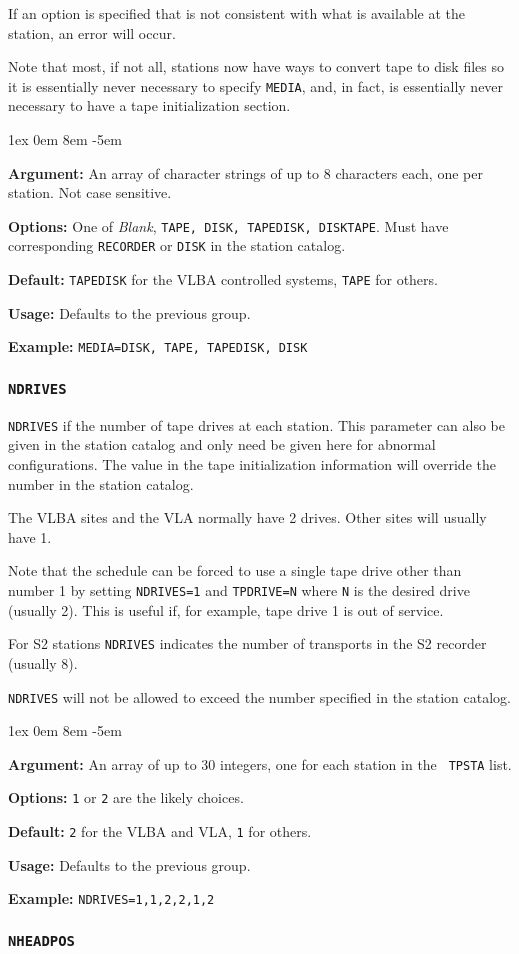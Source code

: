 \documentclass{report}
\newcommand{\rcwbox}[5]{
  \begin{list}{}{\parsep 1ex  \itemsep 0em
                 \leftmargin 8em  \itemindent -5em }
    \item {\bf Argument:} #1
    \item {\bf Options:}  #2
    \item {\bf Default:}  #3
    \item {\bf Usage:}    #4
    \item {\bf Example:}  #5
  \end{list}
}
\begin{document}
If an option is specified that is not consistent with what is available
at the station, an error will occur.

Note that most, if not all, stations now have ways to convert tape to
disk files so it is essentially never necessary to specify {\tt MEDIA},
and, in fact, is essentially never necessary to have a tape initialization
section.


\rcwbox
{An array of character strings of up to 8 characters each, one per
station.  Not case sensitive.}
{One of {\sl Blank}, {\tt TAPE, DISK, TAPEDISK, DISKTAPE}.  Must
have corresponding {\tt RECORDER} or {\tt DISK} in the station
catalog.}
{{\tt TAPEDISK} for the VLBA controlled systems, {\tt TAPE} for others.}
{Defaults to the previous group.}
{{\tt MEDIA=DISK, TAPE, TAPEDISK, DISK}}


\subsubsection{\label{TP:NDRIVES}{\tt NDRIVES}}

{\tt NDRIVES} if the number of tape drives at each station. This
parameter can also be given in the station catalog and only need
be given here for abnormal configurations.  The value in the
tape initialization information will override the number in the
station catalog.

The VLBA sites and the VLA normally have 2 drives.
Other sites will usually have 1.

Note that the schedule can be forced to use a single tape drive other
than number 1 by setting {\tt NDRIVES=1} and {\tt TPDRIVE=N} where
{\tt N} is the desired drive (usually 2). This is useful if, for
example, tape drive 1 is out of service.

For S2 stations {\tt NDRIVES} indicates the number of transports in the
S2 recorder (usually 8).

{\tt NDRIVES} will not be allowed to exceed the number specified in
the station catalog.

\rcwbox
{An array of up to 30 integers, one for each station in the {\tt
TPSTA} list.}
{{\tt 1} or {\tt 2} are the likely choices.}
{{\tt 2} for the VLBA and VLA, {\tt 1} for others.}
{Defaults to the previous group.}
{{\tt NDRIVES=1,1,2,2,1,2}}

\subsubsection{\label{TP:NHEADPOS}{\tt NHEADPOS}}
\end{document}
